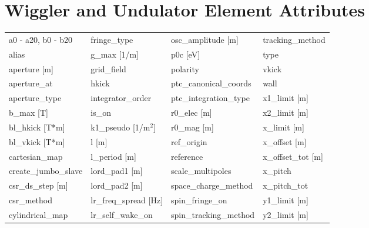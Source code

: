  \section{Wiggler and Undulator Element Attributes}
 \label{s:list.wiggler}
 
 \begin{tabular}{llll} \toprule
a0 - a20, b0 - b20               & fringe_type                      & osc_amplitude [m]                & tracking_method                  \\
alias                            & g_max [1/m]                      & p0c [eV]                         & type                             \\
aperture [m]                     & grid_field                       & polarity                         & vkick                            \\
aperture_at                      & hkick                            & ptc_canonical_coords             & wall                             \\
aperture_type                    & integrator_order                 & ptc_integration_type             & x1_limit [m]                     \\
b_max [T]                        & is_on                            & r0_elec [m]                      & x2_limit [m]                     \\
bl_hkick [T*m]                   & k1_pseudo [1/m$^2$]              & r0_mag [m]                       & x_limit [m]                      \\
bl_vkick [T*m]                   & l [m]                            & ref_origin                       & x_offset [m]                     \\
cartesian_map                    & l_period [m]                     & reference                        & x_offset_tot [m]                 \\
create_jumbo_slave               & lord_pad1 [m]                    & scale_multipoles                 & x_pitch                          \\
csr_ds_step [m]                  & lord_pad2 [m]                    & space_charge_method              & x_pitch_tot                      \\
csr_method                       & lr_freq_spread [Hz]              & spin_fringe_on                   & y1_limit [m]                     \\
cylindrical_map                  & lr_self_wake_on                  & spin_tracking_method             & y2_limit [m]                     \\

\end{tabular}
